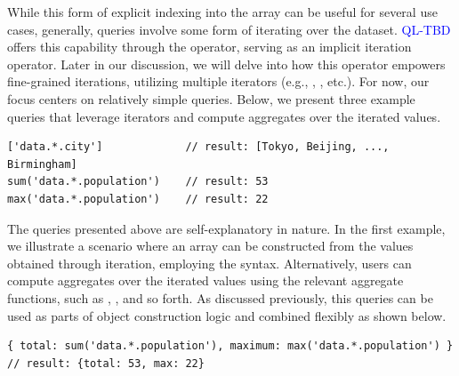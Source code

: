 \documentclass[runningheads]{llncs}
\newcommand{\lang}{\textcolor{blue}{QL-TBD}}
\begin{document}
While this form of explicit indexing into the array can be useful for several
use cases, generally, queries involve some form of iterating over the dataset.
\lang{} offers this capability through the \inline{*} operator,
serving as an implicit iteration operator.
Later in our discussion, we will delve into how this operator empowers fine-grained
iterations, utilizing multiple iterators
(e.g., , , etc.).
For now, our focus centers on relatively simple queries.
Below, we present three example queries that leverage iterators and compute
aggregates over the iterated values.

\begin{lstlisting}[style=JavaScript, columns=flexible]
['data.*.city']             // result: [Tokyo, Beijing, ..., Birmingham]
sum('data.*.population')    // result: 53
max('data.*.population')    // result: 22
\end{lstlisting}

The queries presented above are self-explanatory in nature.
In the first example, we illustrate a scenario where an array can be constructed
from the values obtained through iteration, employing the \inline{[...]} syntax.
Alternatively, users can compute aggregates over the iterated values using the
relevant aggregate functions, such as , , and so forth.
As discussed previously, this queries can be used as parts of object
construction logic and combined flexibly as shown below.

\begin{lstlisting}[style=JavaScript, columns=flexible, numbers=none]
{ total: sum('data.*.population'), maximum: max('data.*.population') }
// result: {total: 53, max: 22}
\end{lstlisting}


\end{document}
